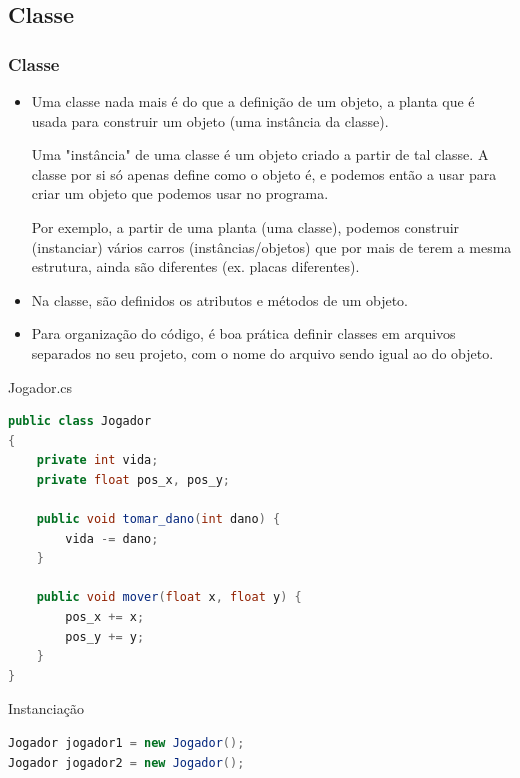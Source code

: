 \documentclass{beamer}
\begin{document}
	\subsection{Classe} %
	\begin{frame}
		\frametitle{Classe}

		\begin{itemize}
			\item Uma classe nada mais é do que a definição de um objeto, a
				planta que é usada para construir um objeto (uma instância da
				classe).

			\begin{definition}
				Uma "instância" de uma classe é um objeto criado a partir de
				tal classe. A classe por si só apenas define como o objeto é, e
				podemos então a usar para criar um objeto que podemos usar no
				programa.

				Por exemplo, a partir de uma planta (uma classe),
				podemos construir (instanciar) vários carros
				(instâncias/objetos) que por mais de terem a mesma estrutura,
				ainda são diferentes (ex. placas diferentes).
			\end{definition}

			\item Na classe, são definidos os atributos e métodos de um objeto.

			\item Para organização do código, é boa prática definir classes em
				arquivos separados no seu projeto, com o nome do arquivo sendo
				igual ao do objeto.
		\end{itemize}

	\end{frame}

	\begin{frame}[fragile]
		\begin{block}{Jogador.cs}
			\begin{lstlisting}[language=Java,basicstyle=\ttfamily,keywordstyle=\color{blue}]
public class Jogador
{
	private int vida;
	private float pos_x, pos_y;

	public void tomar_dano(int dano) {
		vida -= dano;
	}

	public void mover(float x, float y) {
		pos_x += x;
		pos_y += y;
	}
}
			\end{lstlisting}
		\end{block}
	\end{frame}

	\begin{frame}[fragile]
		\begin{block}{Instanciação}
			\begin{lstlisting}[language=Java,basicstyle=\ttfamily,keywordstyle=\color{blue}]
Jogador jogador1 = new Jogador();
Jogador jogador2 = new Jogador();
			\end{lstlisting}
		\end{block}
	\end{frame}
\end{document}
